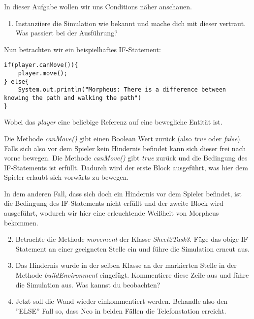 In dieser Aufgabe wollen wir uns Conditions näher anschauen.
\begin{enumerate}[label=\alph*)]                           
    \item Instanziiere die Simulation wie bekannt und mache dich mit dieser vertraut.
    Was passiert bei der Ausführung?
\end{enumerate}

\begin{Infobox}[IF-Condition]
    Nun betrachten wir ein beispielhaftes IF-Statement:
    \begin{lstlisting}[breaklines=true]
if(player.canMove()){
    player.move();
} else{
    System.out.println("Morpheus: There is a difference between knowing the path and walking the path")
}
    \end{lstlisting}
    Wobei das \textit{player} eine beliebige Referenz auf eine bewegliche Entität ist.\par
    Die Methode \textit{canMove()} gibt einen Boolean Wert zurück (also \textit{true} oder \textit{false}).
    Falls sich also vor dem Spieler kein Hindernis befindet kann sich dieser frei nach vorne bewegen. Die Methode
    \textit{canMove()} gibt \textit{true} zurück und die Bedingung des IF-Statements ist erfüllt. Dadurch wird der erste Block
    ausgeführt, was hier dem Spieler erlaubt sich vorwärts zu bewegen.\par 
    In dem anderen Fall, dass sich doch ein Hindernis vor dem Spieler befindet, ist die Bedingung des IF-Statements nicht erfüllt und 
    der zweite Block wird ausgeführt, wodurch wir hier eine erleuchtende Weißheit von Morpheus bekommen.
\end{Infobox}
\begin{enumerate}[label=\alph*)] \setcounter{enumi}{1}
    \item Betrachte die Methode \textit{movement} der Klasse \textit{Sheet2Task3}. Füge das obige IF-Statement an einer geeigneten Stelle ein 
    und führe die Simulation erneut aus.
    \item Das Hindernis wurde in der selben Klasse an der markierten Stelle in der Methode \textit{buildEnvironment} eingefügt.
    Kommentiere diese Zeile aus und führe die Simulation aus. Was kannst du beobachten?
    \item Jetzt soll die Wand wieder einkommentiert werden. Behandle also den ''ELSE'' Fall so, dass Neo in beiden Fällen die Telefonstation erreicht.

\end{enumerate}
